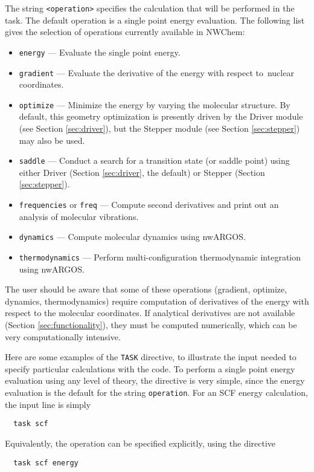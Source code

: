 The string \verb+<operation>+ specifies the calculation that will
be performed in the task.  The default operation is a single point energy
evaluation.  The following list gives the selection of operations currently
available in NWChem:
\begin{itemize}
\item \verb+energy+ --- Evaluate the single point energy.
\item \verb+gradient+ --- Evaluate the derivative of the energy with respect to\
   nuclear coordinates.
\item \verb+optimize+ --- Minimize the energy by varying the molecular
   structure.  By default, this geometry optimization is presently driven by the Driver
   module (see Section \ref{sec:driver}), but the Stepper module
   (see Section \ref{sec:stepper}) may also be used.
\item \verb+saddle+ --- Conduct a search for a transition state (or saddle point) 
  using either Driver (Section \ref{sec:driver}, the default) or
  Stepper (Section \ref{sec:stepper}).
\item \verb+frequencies+ or \verb+freq+ --- Compute second derivatives 
and print out an analysis of molecular vibrations.
\item \verb+dynamics+ --- Compute molecular dynamics using nwARGOS.
\item \verb+thermodynamics+ --- Perform multi-configuration thermodynamic integration
    using nwARGOS.
\end{itemize}


The user should be aware that some of these operations (gradient,
optimize, dynamics, thermodynamics) require computation of
derivatives of the energy with respect to the molecular coordinates.
If analytical derivatives are not available (Section
\ref{sec:functionality}), they must be computed numerically, which can
be very computationally intensive.

Here are some examples of the \verb+TASK+ directive, to illustrate the
input needed to specify particular calculations with the code.  To
perform a single point energy evaluation using any level of theory, the
directive is very simple, since the energy evaluation is the default
for the string \verb+operation+.  For an SCF energy calculation, the
input line is simply
\begin{verbatim}
  task scf
\end{verbatim}
Equivalently, the operation can be specified explicitly, using the
directive
\begin{verbatim}
  task scf energy
\end{verbatim}

